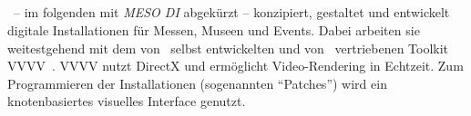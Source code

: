 \subsection{\mesodi}
\label{sec:em-meso-digital-initeriors}

\mesodi~-- im folgenden mit \emph{MESO DI} abgekürzt -- konzipiert, gestaltet
und entwickelt digitale Installationen für Messen, Museen und Events.  Dabei
arbeiten sie weitestgehend mit dem von \meso~selbst entwickelten und von
\mesois~vertriebenen Toolkit VVVV~\cite{v4}.  VVVV nutzt DirectX und ermöglicht
Video-Rendering in Echtzeit.  Zum Programmieren der Installationen (sogenannten
\enquote{Patches}) wird ein knotenbasiertes visuelles Interface genutzt.
